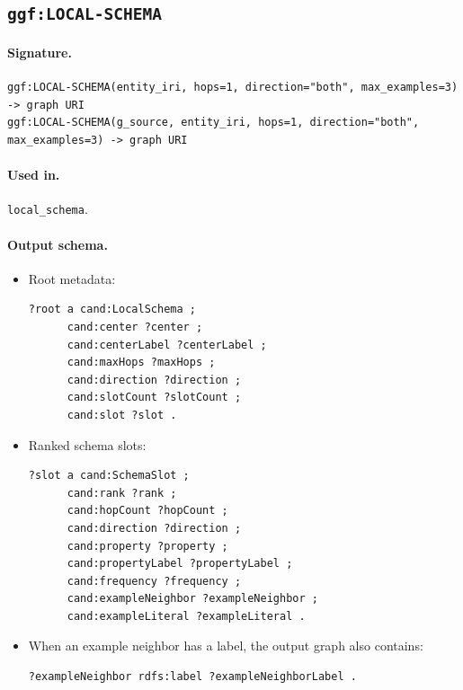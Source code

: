 \subsection{\texttt{ggf:LOCAL-SCHEMA}}
\label{subsec:ggf-local-schema}

\paragraph{Signature.}
\begin{verbatim}
ggf:LOCAL-SCHEMA(entity_iri, hops=1, direction="both", max_examples=3) -> graph URI
ggf:LOCAL-SCHEMA(g_source, entity_iri, hops=1, direction="both", max_examples=3) -> graph URI
\end{verbatim}

\paragraph{Used in.}
\texttt{local\_schema}.

\paragraph{Output schema.}
\begin{itemize}
\item Root metadata:
\begin{verbatim}
?root a cand:LocalSchema ;
      cand:center ?center ;
      cand:centerLabel ?centerLabel ;
      cand:maxHops ?maxHops ;
      cand:direction ?direction ;
      cand:slotCount ?slotCount ;
      cand:slot ?slot .
\end{verbatim}
\item Ranked schema slots:
\begin{verbatim}
?slot a cand:SchemaSlot ;
      cand:rank ?rank ;
      cand:hopCount ?hopCount ;
      cand:direction ?direction ;
      cand:property ?property ;
      cand:propertyLabel ?propertyLabel ;
      cand:frequency ?frequency ;
      cand:exampleNeighbor ?exampleNeighbor ;
      cand:exampleLiteral ?exampleLiteral .
\end{verbatim}
\item When an example neighbor has a label, the output graph also contains:
\begin{verbatim}
?exampleNeighbor rdfs:label ?exampleNeighborLabel .
\end{verbatim}
\end{itemize}

